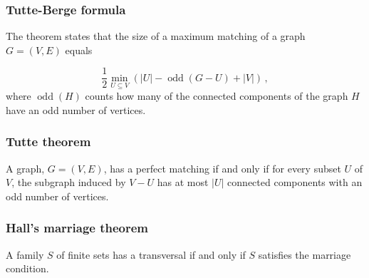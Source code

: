 \subsubsection{Tutte-Berge formula}
The theorem states that the size of a maximum matching of a graph $G=(V,E)$ equals

$${\frac {1}{2}}\min _{U\subseteq V}\left(|U|-\operatorname {odd} (G-U)+|V|\right)\,,$$
where $\operatorname {odd} (H)$ counts how many of the connected components of the graph $H$ have an odd number of vertices.

\subsubsection{Tutte theorem}

A graph, $G = (V, E)$, has a perfect matching if and only if for every subset $U$ of $V$, the subgraph induced by $V-U$ has at most $|U|$ connected components with an odd number of vertices.

\subsubsection{Hall's marriage theorem}

A family $S$ of finite sets has a transversal if and only if $S$ satisfies the marriage condition.

